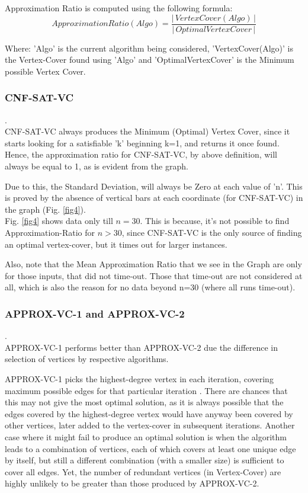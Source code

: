 \documentclass[11pt]{llncs}
\begin{document}
		Approximation Ratio is computed using the following formula: \cite{prj_pdf}
	\begin{equation}
		ApproximationRatio(Algo) = \frac {|\,VertexCover(Algo)\,|} {|\,OptimalVertexCover\,|}
	\end{equation}
	
	Where: 'Algo' is the current algorithm being considered, 
		  'VertexCover(Algo)' is the Vertex-Cover found using 'Algo'
		  and 'OptimalVertexCover'  is the Minimum possible Vertex Cover.


	\subsubsection{CNF-SAT-VC}.\\

		CNF-SAT-VC always produces the Minimum (Optimal) Vertex Cover, since it starts looking for a satisfiable 'k' beginning k=1, and returns it once found. Hence, the approximation ratio for CNF-SAT-VC, by above definition, will always be equal to 1, as is evident from the graph.

		Due to this, the Standard Deviation, will always be Zero at each value of 'n'. This is proved by the absence of vertical bars at each coordinate (for CNF-SAT-VC)  in the graph (Fig. \ref{fig4}).\\

		Fig. \ref{fig4} shows data only till $n = 30$. This is because, it's not possible to find Approximation-Ratio for $n > 30$, since CNF-SAT-VC is the only source of finding an optimal vertex-cover, but it times out for larger instances.

		Also, note that the Mean Approximation Ratio that we see in the Graph are only for those inputs, that did not time-out. Those that time-out are not considered at all, which is also the reason for no data beyond  n=30 (where all runs time-out).

	
	\subsubsection{APPROX-VC-1 and APPROX-VC-2}.\\
		
		APPROX-VC-1 performs better than APPROX-VC-2 due the difference in selection of vertices by respective algorithms.
		
		APPROX-VC-1 picks the highest-degree vertex in each iteration, covering maximum possible edges for that particular iteration \cite{prj_pdf}. There are chances that this may not give the most optimal solution, as it is always possible that the edges covered by the highest-degree vertex would have anyway been covered by other vertices, later added to the vertex-cover in subsequent iterations. Another case where it might fail to produce an optimal solution is when the algorithm leads to a combination of vertices, each of which covers at least one unique edge by itself, but still a different combination (with a smaller size) is sufficient to cover all edges. Yet, the number of redundant vertices (in Vertex-Cover) are highly unlikely to be greater than those produced by APPROX-VC-2.
		
\end{document}
